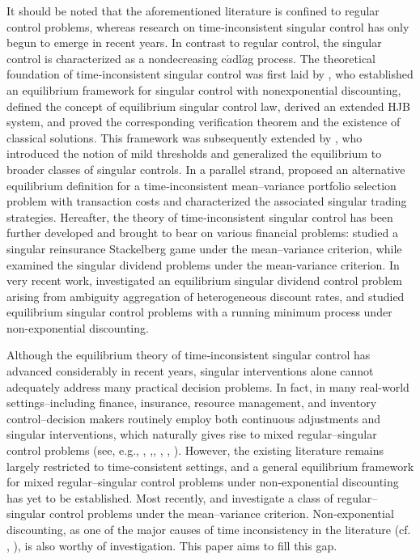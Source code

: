 \documentclass[11pt,reqno]{article}%
\numberwithin{equation}{section}
\begin{document}
It should be noted that the aforementioned literature is confined to regular control problems,  whereas research on time‑inconsistent singular control has only begun to emerge in recent years. In contrast to regular control, the singular control is characterized as a nondecreasing c$\acute{a}$dl$\acute{a}$g process. The theoretical foundation of time‑inconsistent singular control was first laid by \citet{liang2024equilibria}, who established an equilibrium framework for singular control with nonexponential discounting, defined the concept of equilibrium singular control law, derived an extended HJB system, and proved the corresponding verification theorem and the existence of classical solutions. This framework was subsequently extended by \citet{bodnariu2025time}, who introduced the notion of mild thresholds and generalized the equilibrium to broader classes of singular controls. In a parallel strand, \citet{dai2024dynamic} proposed an alternative equilibrium definition for a time‑inconsistent mean–variance portfolio selection problem with transaction costs and characterized the associated singular trading strategies. Hereafter, the theory of time‑inconsistent singular control has been further developed and brought to bear on various financial problems: \citet{liang2025stackelberg} studied a singular reinsurance Stackelberg game under the mean–variance criterion, while \citet{cao2026equilibrium} examined the singular dividend problems under the mean-variance criterion. In very recent work, \citet{caoyue2026equilibrium} investigated an equilibrium singular dividend control problem arising from ambiguity aggregation of heterogeneous discount rates, and \citet{dai2026time} studied equilibrium singular control problems with a running minimum process under non-exponential discounting. 

Although the equilibrium theory of time‑inconsistent singular control has advanced considerably in recent years, singular interventions alone cannot adequately address many practical decision problems. In fact, in many real-world settings--including finance, insurance, resource management, and inventory control--decision makers routinely employ both continuous adjustments and singular interventions, which naturally gives rise to mixed regular–singular control problems (see, e.g., \citet{chen2021free}, \citet{jgaard1999controlling},\citet{guan2023dynamic}, \citet{guo2004constrained}, \citet{qiu2023optimal}, \citet{taksar1998optimal}). However, the existing literature  remains largely restricted to time‑consistent settings, and a general equilibrium framework for mixed regular–singular control problems under non‑exponential discounting has yet to be established. Most recently, \citet{liang2026timeconsistent} and \citet{liang2026equilibrium} investigate a class of regular–singular control problems under the mean–variance criterion. Non‑exponential discounting, as one of the major causes of time inconsistency in the literature (cf. \citet{ekeland2008invest}, \citet{harris2001the}), is also worthy of investigation. This paper aims to fill this gap.
\end{document}
